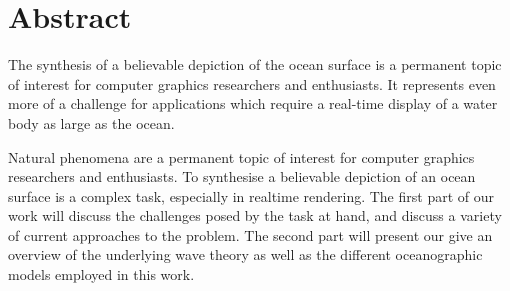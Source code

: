 \chapter*{Abstract}


The synthesis of a believable depiction of the ocean surface is a permanent
topic of interest for computer graphics researchers and enthusiasts. It
represents even more of a challenge for applications which require a
real-time display of a water body as large as the ocean.

Natural phenomena are a permanent topic of interest for computer graphics researchers and enthusiasts. To synthesise a believable
depiction of an ocean surface is a complex task, especially in realtime rendering. The first part of our work will discuss the
challenges posed by the task at hand, and discuss a variety of current approaches to the problem. The second part will present
our give an
overview of the underlying wave theory as well as the different oceanographic models employed in this work.